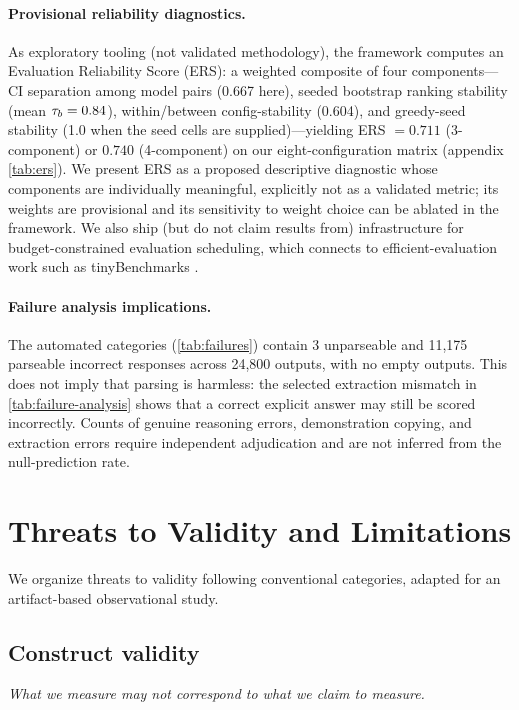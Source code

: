 \paragraph{Provisional reliability diagnostics.}
As exploratory tooling (not validated methodology), the framework computes
an Evaluation Reliability Score (ERS): a weighted composite of four
components---CI separation among model pairs (0.667 here), seeded bootstrap
ranking stability (mean $\tau_b=0.84$), within/between config-stability
(0.604), and greedy-seed stability (1.0 when the seed cells are
supplied)---yielding ERS $= 0.711$ (3-component) or $0.740$ (4-component)
on our eight-configuration matrix (appendix \cref{tab:ers}). We present
ERS as a proposed descriptive diagnostic whose components are individually
meaningful, explicitly not as a validated metric; its weights are
provisional and its sensitivity to weight choice can be ablated in the
framework. We also ship (but do not claim results from) infrastructure for
budget-constrained evaluation scheduling, which connects to
efficient-evaluation work such as tinyBenchmarks
\citep{polo2024tinybenchmarks}.

\paragraph{Failure analysis implications.}
The automated categories (\cref{tab:failures}) contain 3 unparseable and
11,175 parseable incorrect responses across 24,800 outputs, with no empty
outputs. This does not imply that parsing is harmless: the selected
extraction mismatch in \cref{tab:failure-analysis} shows that a correct
explicit answer may still be scored incorrectly. Counts of genuine reasoning
errors, demonstration copying, and extraction errors require independent
adjudication and are not inferred from the null-prediction rate.

\section{Threats to Validity and Limitations}
\label{sec:limitations}

We organize threats to validity following conventional categories, adapted
for an artifact-based observational study.

\subsection{Construct validity}
\textit{What we measure may not correspond to what we claim to measure.}

